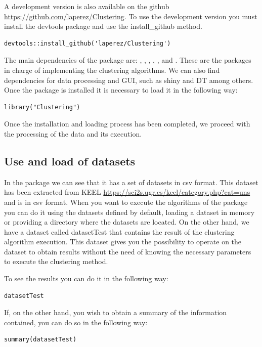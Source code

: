 A development version is also available on the github \url{https://github.com/laperez/Clustering}. To use the development version you must install the devtools package and use the install\_github method.

\begin{verbatim}
devtools::install_github('laperez/Clustering')
\end{verbatim}

The main dependencies of the   package are: , , , , ,  and . These are the packages in charge of implementing the clustering algorithms. We can also find dependencies for data processing and GUI, such as shiny and DT among others. Once the package is installed it is necessary to load it in the following way:

\begin{verbatim}
library("Clustering")
\end{verbatim}

Once the installation and loading process has been completed, we proceed with the processing of the data and its execution.

\subsection*{Use and load of datasets}

In the package we can see that it has a set of datasets in csv format. This dataset has been extracted from KEEL \url{https://sci2s.ugr.es/keel/category.php?cat=uns} and is in csv format. When you want to execute the algorithms of the package you can do it using the datasets defined by default, loading a dataset in memory or providing a directory where the datasets are located. On the other hand, we have a dataset called datasetTest that contains the result of the clustering algorithm execution. This dataset gives you the possibility to operate on the dataset to obtain results without the need of knowing the necessary parameters to execute the clustering method.

To see the results you can do it in the following way:
\begin{verbatim}
datasetTest
\end{verbatim}

If, on the other hand, you wish to obtain a summary of the information contained, you can do so in the following way:

\begin{verbatim}
summary(datasetTest)
\end{verbatim}

